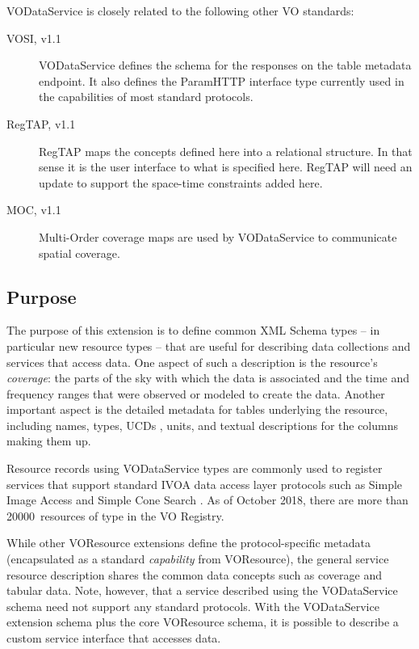 \documentclass[11pt,a4paper]{ivoa}
\begin{document}
VODataService is closely related to the following other VO standards:

\begin{description}
\item[VOSI, v1.1 \citep{2017ivoa.spec.0524G}] VODataService defines the
schema for the responses on the table metadata endpoint.  It also
defines the ParamHTTP interface type currently used in the capabilities of most
standard protocols.
\item[RegTAP, v1.1 \citep{2019ivoa.spec.1011D}] RegTAP maps the concepts
defined here into a relational structure.  In that sense it is the
user interface to what is specified here.  RegTAP will need an update
to support the space-time constraints added here.
\item[MOC, v1.1 \citep{2019ivoa.spec.1007F}] Multi-Order coverage maps
are used by VODataService to communicate spatial coverage.
\end{description}

\subsection{Purpose}


The purpose of this extension is to define common XML Schema
types -- in particular new resource types -- that are useful for describing
data collections and services that access data.  One aspect of such a
description is the resource's \emph{coverage}:  the parts of the
sky with which the data is associated and the time and frequency ranges that
were observed or modeled to create the data.  Another important aspect
is the detailed metadata for tables underlying the resource, including
names, types, UCDs
\citep{2005ivoa.spec.1231D}, units,
and textual descriptions for the columns making them up.  

Resource records using VODataService types are commonly used to register
services that support standard IVOA data access layer protocols such
as Simple Image Access \citep{2015ivoa.spec.1223D} and Simple Cone Search
\citep{2008ivoa.specQ0222P}.  As of October 2018, there are more than
20000~resources of type  in the VO Registry.

While other VOResource extensions 
define the protocol-specific metadata (encapsulated as a standard
\emph{capability} from VOResource), the general service
resource description shares the common data concepts such as
coverage and tabular data.  Note, however, that a service described
using the VODataService schema need not support any standard
protocols.  With the VODataService extension schema plus the core
VOResource schema, it is possible to describe a custom service
interface that accesses data.  
\end{document}

